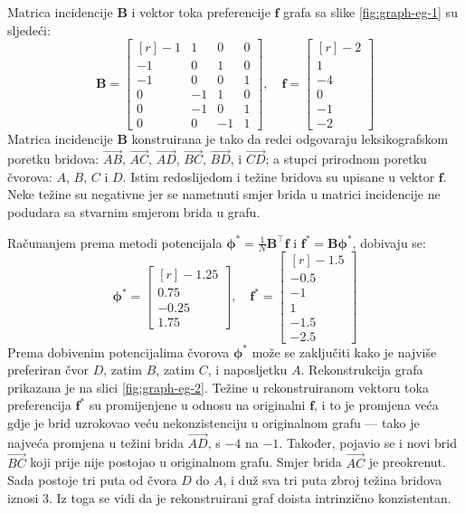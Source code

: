 \documentclass[lmodern, utf8, diplomski, numeric]{fer}
\newcommand{\matr}[1]{\mathbold{#1}}
\newcommand{\T}{\top}
\begin{document}
  Matrica incidencije $\matr{B}$ i vektor toka preferencije $\matr{f}$ grafa sa slike \ref{fig:graph-eg-1} su sljedeći:
  \begin{equation*}
  \matr{B} = \begin{bmatrix*}[r]
  -1 & 1 & 0 & 0 \\
  -1 & 0 & 1 & 0 \\
  -1 & 0 & 0 & 1 \\
  0 & -1 & 1 & 0 \\
  0 & -1 & 0 & 1 \\
  0 & 0 & -1 & 1
  \end{bmatrix*},\quad
  \matr{f} = \begin{bmatrix*}[r]
  -2 \\ 1 \\ -4 \\ 0 \\ -1 \\ -2
  \end{bmatrix*}
  \end{equation*}
  Matrica incidencije $\matr{B}$ konstruirana je tako da redci odgovaraju leksikografskom poretku bridova: $\overrightarrow{AB}$, $\overrightarrow{AC}$, $\overrightarrow{AD}$, $\overrightarrow{BC}$, $\overrightarrow{BD}$, i $\overrightarrow{CD}$; a stupci prirodnom poretku čvorova: $A$, $B$, $C$ i $D$.
  Istim redoslijedom i težine bridova su upisane u vektor $\matr{f}$.
  Neke težine su negativne jer se nametnuti smjer brida u matrici incidencije ne podudara sa stvarnim smjerom brida u grafu.
  
  Računanjem prema metodi potencijala $\matr{\phi^*} = \frac{1}{N}\matr{B}^\T \matr{f}$ i $\matr{f^*} = \matr{B} \matr{\phi^*}$, dobivaju se:
  \begin{equation*}
  \matr{\phi}^* = \begin{bmatrix*}[r]
  -1.25 \\ 0.75 \\ -0.25 \\ 1.75
  \end{bmatrix*}, \quad
  \matr{f}^* = \begin{bmatrix*}[r]
  -1.5 \\ -0.5 \\ -1 \\ 1 \\ -1.5 \\ -2.5
  \end{bmatrix*}
  \end{equation*}
  Prema dobivenim potencijalima čvorova $\matr{\phi}^*$ može se zaključiti kako je najviše preferiran čvor $D$, zatim $B$, zatim $C$, i naposljetku $A$.
  Rekonstrukcija grafa prikazana je na slici \ref{fig:graph-eg-2}.
  Težine u rekonstruiranom vektoru toka preferencija $\matr{f}^*$ su promijenjene u odnosu na originalni $\matr{f}$, i to je promjena veća gdje je brid uzrokovao veću nekonzistenciju u originalnom grafu --- tako je najveća promjena u težini brida $\overrightarrow{AD}$, s $-4$ na $-1$.
  Također, pojavio se i novi brid $\overrightarrow{BC}$ koji prije nije postojao u originalnom grafu.
  Smjer brida $\overrightarrow{AC}$ je preokrenut.
  Sada postoje tri puta od čvora $D$ do $A$, i duž sva tri puta zbroj težina bridova iznosi 3.
  Iz toga se vidi da je rekonstruirani graf doista intrinzično konzistentan.
  
\end{document}
